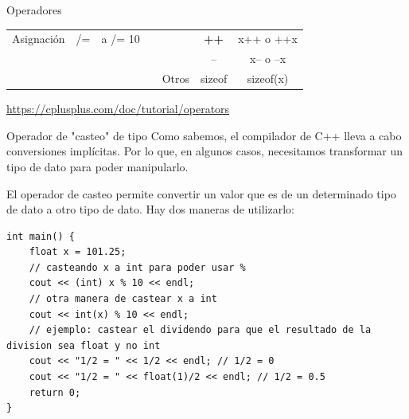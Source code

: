 \documentclass[12pt]{beamer}
\begin{document}
\begin{frame}{Operadores}
\begin{table}[]
\begin{tabular}{lccl|l|c|c|}
            \multicolumn{1}{|l|}{\multirow{-5}{*}{Asignación}} & \multicolumn{1}{c|}{/=} & \multicolumn{1}{c|}{a /= 10} &  &  & \textbf{++} & x++ o ++x \\ \cline{1-3} \cline{6-7} 
            & \multicolumn{1}{l}{} & \multicolumn{1}{l}{} &  &  & -- & x-- o --x \\ \cline{6-7} 
            & \multicolumn{1}{l}{} & \multicolumn{1}{l}{} &  & \multirow{-3}{*}{Otros} & sizeof & sizeof(x) \\ \cline{5-7} 
        \end{tabular}
    \end{table}
    \centering\footnotesize\url{https://cplusplus.com/doc/tutorial/operators}
\end{frame}

\begin{frame}[fragile]{Operador de "casteo" de tipo}
    Como sabemos, el compilador de C++ lleva a cabo conversiones implícitas. Por lo que, en algunos casos, necesitamos transformar un tipo de dato para poder manipularlo. 

    \medskip

    El operador de casteo permite convertir un valor que es de un determinado tipo de dato a otro tipo de dato. Hay dos maneras de utilizarlo:
\begin{lstlisting}[basicstyle=\tiny]
int main() {
    float x = 101.25;
    // casteando x a int para poder usar %
    cout << (int) x % 10 << endl;
    // otra manera de castear x a int
    cout << int(x) % 10 << endl;
    // ejemplo: castear el dividendo para que el resultado de la division sea float y no int
    cout << "1/2 = " << 1/2 << endl; // 1/2 = 0
    cout << "1/2 = " << float(1)/2 << endl; // 1/2 = 0.5
    return 0;
}
\end{lstlisting}
\end{frame}
\end{document}

